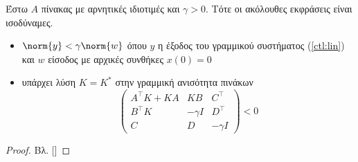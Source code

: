 \begin{namedthrm}{}
    Έστω $A$ πίνακας με αρνητικές ιδιοτιμές και $\gamma > 0$. Τότε οι ακόλουθες 
    εκφράσεις είναι ισοδύναμες.
    \begin{itemize}
        \item $\norm{y} < \gamma \norm{w}$ όπου $y$ η έξοδος του γραμμικού 
        συστήματος (\ref{ctl:lin}) και $w$ είσοδος με αρχικές συνθήκες 
        $x(0) = 0$
        \item υπάρχει λύση $K = K^{\ast}$ στην γραμμική ανισότητα πινάκων
        \begin{equation}
            \begin{pmatrix}
                A^{\intercal} K + KA & KB & C^{\intercal} \\
                B^{\intercal}K & -\gamma I & D^{\intercal} \\
                C & D & -\gamma I
            \end{pmatrix}
            < 0
        \end{equation}     
    \end{itemize}
    \label{lemma}
\end{namedthrm}
\begin{proof}
    Βλ. []
\end{proof}


